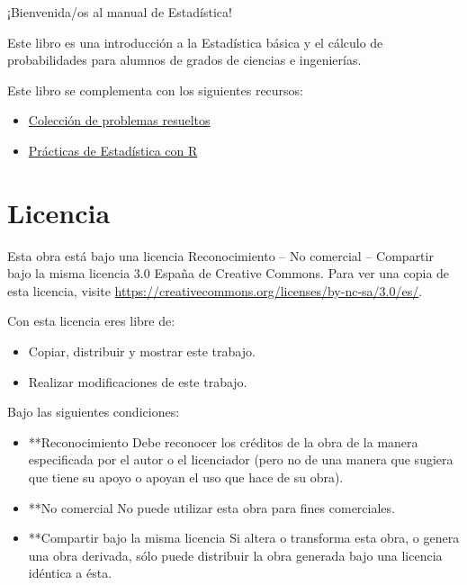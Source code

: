 \documentclass[
  a4paper,
]{scrreport}
\providecommand{\tightlist}{%
  \setlength{\itemsep}{0pt}\setlength{\parskip}{0pt}}\usepackage{longtable,booktabs,array}
\theoremstyle{definition}
\theoremstyle{definition}
\theoremstyle{plain}
\theoremstyle{remark}
\begin{document}

¡Bienvenida/os al manual de Estadística!

Este libro es una introducción a la Estadística básica y el cálculo de
probabilidades para alumnos de grados de ciencias e ingenierías.

Este libro se complementa con los siguientes recursos:

\begin{itemize}
\tightlist
\item
  \href{https://aprendeconalf.es/estadistica-ejercicios/}{Colección de
  problemas resueltos}
\item
  \href{https://aprendeconalf.es/estadistica-practicas-r/}{Prácticas de
  Estadística con R}
\end{itemize}

\hypertarget{licencia}{%
\section*{Licencia}\label{licencia}}


Esta obra está bajo una licencia Reconocimiento -- No comercial --
Compartir bajo la misma licencia 3.0 España de Creative Commons. Para
ver una copia de esta licencia, visite
\url{https://creativecommons.org/licenses/by-nc-sa/3.0/es/}.

Con esta licencia eres libre de:

\begin{itemize}
\tightlist
\item
  Copiar, distribuir y mostrar este trabajo.
\item
  Realizar modificaciones de este trabajo.
\end{itemize}

Bajo las siguientes condiciones:

\begin{itemize}
\item
  **Reconocimiento Debe reconocer los créditos de la obra de la manera
  especificada por el autor o el licenciador (pero no de una manera que
  sugiera que tiene su apoyo o apoyan el uso que hace de su obra).
\item
  **No comercial No puede utilizar esta obra para fines comerciales.
\item
  **Compartir bajo la misma licencia Si altera o transforma esta obra, o
  genera una obra derivada, sólo puede distribuir la obra generada bajo
  una licencia idéntica a ésta.
\end{itemize}
\end{document}

